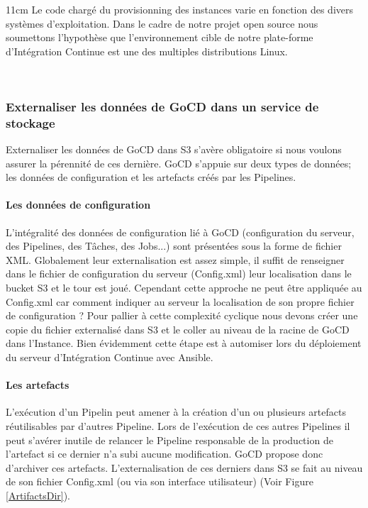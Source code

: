           \begin {boxedminipage} {11cm}
            Le code chargé du provisionning des instances varie en fonction des divers systèmes d'exploitation. Dans le cadre de notre projet open source nous soumettons l'hypothèse que l'environnement cible de notre plate-forme d'Intégration Continue est une des multiples distributions Linux.
          \end {boxedminipage}\\

        \subsubsection{Externaliser les données de GoCD dans un service de stockage}
        Externaliser les données de GoCD dans S3 s'avère obligatoire si nous voulons assurer la pérennité de ces dernière. GoCD s'appuie sur deux types de données; les données de configuration et les artefacts créés par les Pipelines.

          \paragraph{Les données de configuration} L'intégralité des données de configuration lié à GoCD (configuration du serveur, des Pipelines, des Tâches, des Jobs...) sont présentées sous la forme de fichier XML. Globalement leur externalisation est assez simple, il suffit de renseigner dans le fichier de configuration du serveur (Config.xml) leur localisation dans le bucket S3 et le tour est joué. Cependant cette approche ne peut être appliquée au Config.xml car comment indiquer au serveur la localisation de son propre fichier de configuration ? Pour pallier à cette complexité cyclique nous devons créer une copie du fichier externalisé dans S3 et le coller au niveau de la racine de GoCD dans l'Instance. Bien évidemment cette étape est à automiser lors du déploiement du serveur d'Intégration Continue avec Ansible.

          \paragraph{Les artefacts} L'exécution d'un Pipelin peut amener à la création d'un ou plusieurs artefacts réutilisables par d'autres Pipeline. Lors de l'exécution de ces autres Pipelines il peut s'avérer inutile de relancer le Pipeline responsable de la production de l'artefact si ce dernier n'a subi aucune modification. GoCD propose donc d'archiver ces artefacts. L'externalisation de ces derniers dans S3 se fait au niveau de son fichier Config.xml (ou via son interface utilisateur) (Voir Figure \ref{ArtifactsDir}).\\

